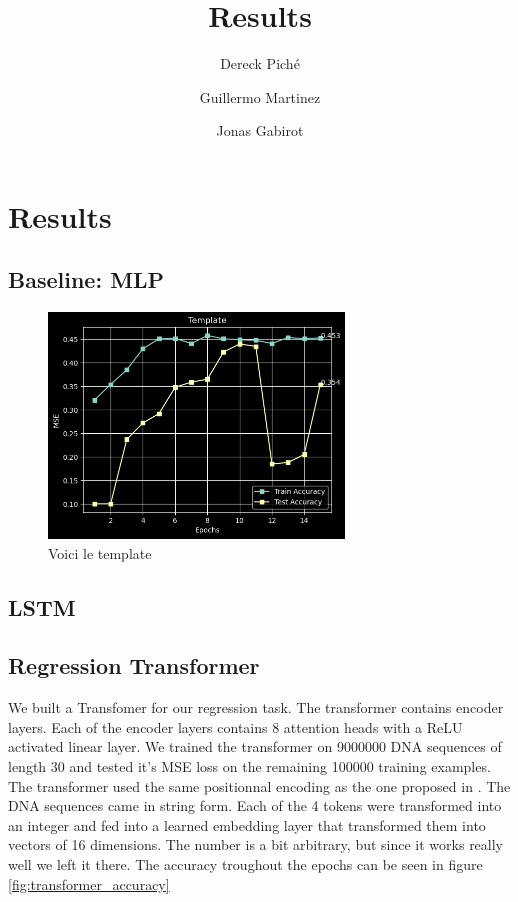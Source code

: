 \documentclass{article}
\title{Results}
\author
{
    Dereck Piché \and
    Guillermo Martinez \and
    Jonas Gabirot \and
}
\begin{document}
\maketitle

\section{Results}


\subsection{Baseline: MLP}

\begin{figure} \label{fig:template}
    \caption{Voici le template} \center
    \includegraphics[width=0.7\textwidth]{images/2023-03-28-10-29-38.png}
\end{figure}

\subsection{LSTM}

\subsection{Regression Transformer}
We built a Transfomer for our regression task. The transformer contains encoder layers. Each of the encoder layers contains 8 attention heads with a ReLU activated linear layer. We trained the transformer on 9000000 DNA sequences of length 30 and tested it's MSE loss on the remaining 100000 training examples. The transformer used the same positionnal encoding as the one proposed in \cite{transformers}. The DNA sequences came in string form. Each of the 4 tokens were transformed into an integer and fed into a learned embedding layer that transformed them into vectors of 16 dimensions. The number is a bit arbitrary, but since it works really well we left it there. The accuracy troughout the epochs can be seen in figure \ref{fig:transformer_accuracy}
\end{document}
